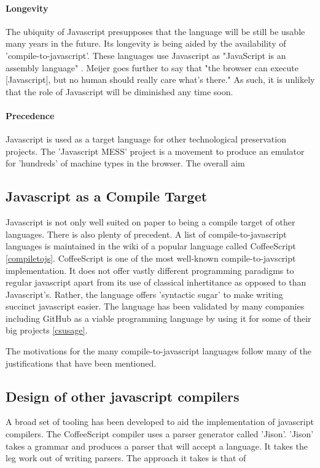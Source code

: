 \documentclass{article}
\begin{document}
\paragraph{Longevity} The ubiquity of Javascript presupposes that the language will be still be usable many years in the future. Its longevity is being aided by the availability of 'compile-to-javascript'. These languages use Javascript as "JavaScript is an assembly language" \cite{hanselman}. Meijer goes further to say that "the browser can execute [Javascript], but no human should really care what’s there." As such, it is unlikely that the role of Javascript will be diminished any time soon.

\paragraph{Precedence} Javascript is used as a target language for other technological preservation projects. The 'Javascript MESS' project is a movement to produce an emulator for 'hundreds' of machine types in the browser. The overall aim 

\subsection{Javascript as a Compile Target}

Javascript is not only well suited on paper to being a compile target of other languages. There is also plenty of precedent. A list of compile-to-javascript languages is maintained in the wiki of a popular language called CoffeeScript \ref{compiletojs}. CoffeeScript is one of the most well-known compile-to-javscript implementation. It does not offer vastly different programming paradigms to regular javascript apart from its use of classical inhertitance as opposed to than Javascript's. Rather, the language offers 'syntactic sugar' to make writing succinct javascript easier. The language has been validated by many companies including GitHub as a viable programming language by using it for some of their big projects \ref{csusage}.

The motivations for the many compile-to-javascript languages follow many of the justifications that have been mentioned.


\subsection{Design of other javascript compilers}

A broad set of tooling has been developed to aid the implementation of javascript compilers. The CoffeeScript compiler uses a parser generator called 'Jison'. 'Jison' takes a grammar and produces a parser that will accept a language. It takes the leg work out of writing parsers. The approach it takes is that of 
\end{document}
